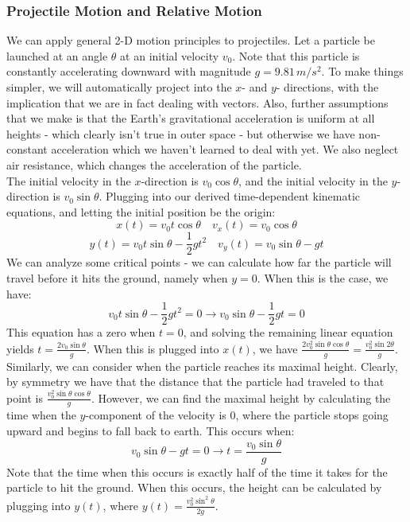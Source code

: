 \subsubsection{Projectile Motion and Relative Motion}
We can apply general 2-D motion principles to projectiles. Let a particle be launched at an angle $\theta$ at an initial velocity $v_0$. Note that this particle is constantly accelerating downward with magnitude $g = 9.81 \, m/s^2$. To make things simpler, we will automatically project into the $x$- and $y$- directions, with the implication that we are in fact dealing with vectors. Also, further assumptions that we make is that the Earth's gravitational acceleration is uniform at all heights - which clearly isn't true in outer space - but otherwise we have non-constant acceleration which we haven't learned to deal with yet. We also neglect air resistance, which changes the acceleration of the particle. \\
The initial velocity in the $x$-direction is $v_0 \cos \theta$, and the initial velocity in the $y$-direction is $v_0 \sin \theta$. Plugging into our derived time-dependent kinematic equations, and letting the initial position be the origin: 
\[
	x(t) = v_0t\cos\theta  \quad v_x(t) = v_0\cos\theta
\]
\[
	y(t) = v_0t\sin\theta  - \frac{1}{2}gt^2 \quad v_y(t) = v_0 \sin \theta - gt
\]
We can analyze some critical points - we can calculate how far the particle will travel before it hits the ground, namely when $y = 0$. When this is the case, we have: 
\[
	v_0t\sin\theta  - \frac{1}{2}gt^2 = 0 \rightarrow v_0\sin\theta - \frac{1}{2}gt = 0
\]
This equation has a zero when $t=0$, and solving the remaining linear equation yields $t = \frac{2v_0\sin\theta}{g}$. When this is plugged into $x(t)$, we have $\frac{2v_0^2\sin\theta \cos\theta}{g} = \frac{v_0^2\sin 2\theta}{g}$.\\
Similarly, we can consider when the particle reaches its maximal height. Clearly, by symmetry we have that the distance that the particle had traveled to that point is $\frac{v_0^2\sin \theta \cos\theta}{g}$. However, we can find the maximal height by calculating the time when the $y$-component of the velocity is $0$, where the particle stops going upward and begins to fall back to earth. This occurs when:
\[
	v_0\sin\theta - gt = 0 \rightarrow t = \frac{v_0\sin\theta}{g}
\]
Note that the time when this occurs is exactly half of the time it takes for the particle to hit the ground. When this occurs, the height can be calculated by plugging into $y(t)$, where $y(t) =\frac{v_0^2\sin^2\theta}{2g}$. \\

